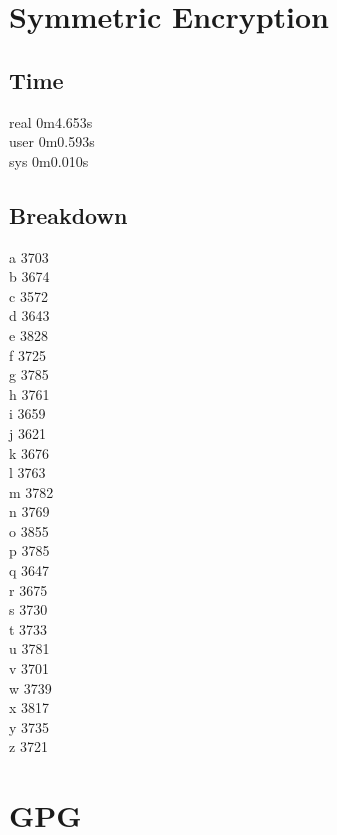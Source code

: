 \documentclass[twocolumn]{article}
\begin{document}
	\section*{Symmetric Encryption} %
	\label{sec:symmetric_encryption}
	
	\subsection*{Time} %
	\label{sub:time}
	real    0m4.653s\\
	user    0m0.593s\\
	sys     0m0.010s\\
	
	\subsection*{Breakdown} %
	\label{sub:breakdown}
	a 3703\\
	b 3674\\
	c 3572\\
	d 3643\\
	e 3828\\
	f 3725\\
	g 3785\\
	h 3761\\
	i 3659\\
	j 3621\\
	k 3676\\
	l 3763\\
	m 3782\\
	n 3769\\
	o 3855\\
	p 3785\\
	q 3647\\
	r 3675\\
	s 3730\\
	t 3733\\
	u 3781\\
	v 3701\\
	w 3739\\
	x 3817\\
	y 3735\\
	z 3721\\
	
	
	
\section*{GPG} %
\label{sub:gpg}
\end{document}
